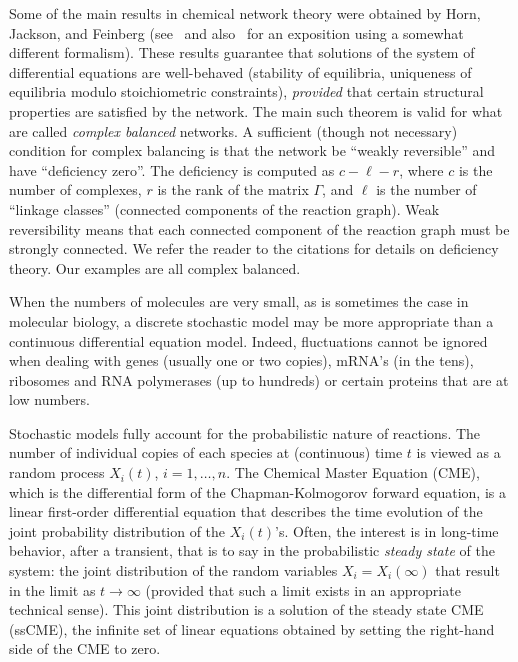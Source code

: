 \documentclass[11pt]{article}
\begin{document}
Some of the main results in chemical network theory were obtained by 
Horn, Jackson, and Feinberg (see~\cite{feinberg1,feinberg2} and 
also~\cite{Tcell01} for an exposition using a somewhat different formalism). 
These results guarantee that solutions of the system of differential equations
are well-behaved (stability of equilibria, uniqueness of equilibria
modulo stoichiometric constraints), \emph{provided} that certain
structural properties are satisfied by the network.
The main such theorem is valid for what are called \emph{complex balanced}
networks.
A sufficient (though not necessary) condition for complex balancing
is that the network be ``weakly reversible'' and have ``deficiency zero''.
The deficiency is computed as $c-\ell-r$, where $c$ is the number
of complexes, $r$ is the rank of the matrix $\Gamma $, and $\ell$ is the number of
``linkage classes'' (connected components of the reaction graph).
Weak reversibility means that each connected component of the reaction graph
must be strongly connected.
We refer the reader to the citations for details on deficiency theory.
Our examples are all complex balanced.

When the numbers of molecules are very small, as is sometimes the case in
molecular biology, a discrete stochastic model may be more appropriate than a
continuous differential equation model.
Indeed, fluctuations cannot be ignored when dealing with genes (usually one
or two copies), mRNA's (in the tens), ribosomes and RNA polymerases (up to
hundreds) or certain proteins that are at low numbers.


Stochastic models fully account for the probabilistic nature of reactions.
The number of individual copies of each species at (continuous) time $t$
is viewed as a random process $X_i(t)$, $i=1,\ldots ,n$.
The Chemical Master Equation (CME), which is the differential form of the
Chapman-Kolmogorov forward equation, is a linear first-order differential
equation that describes the time evolution of the joint probability
distribution of the $X_i(t)$'s.
Often, the interest is in long-time behavior, after a transient,
that is to say in the probabilistic \emph{steady state} of the system:
the joint distribution of the random variables $X_i=X_i(\infty )$ that result in the
limit as $t\rightarrow \infty $ (provided that such a limit exists in an appropriate
technical sense).
This joint distribution is a solution of the steady state CME (ssCME), the
infinite set of linear equations obtained by setting the right-hand side of
the CME to zero. 
\end{document}
